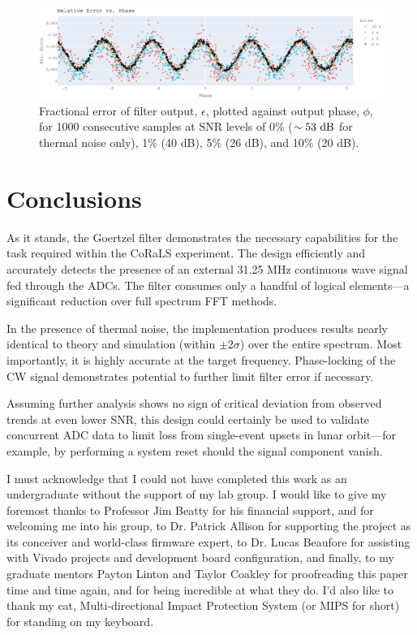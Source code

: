 \documentclass[reprint,amsmath,amssymb,aps,pra]{revtex4-2}
\begin{document}
\begin{figure}[t!]
    \centering
    \includegraphics[width=\linewidth]{figs/error.png}
    \caption{Fractional error of filter output, $\epsilon$, plotted against output phase, $\phi$, for 1000 consecutive samples at SNR levels of 0\% ($\sim53\ \rm{dB}$ for thermal noise only), 1\% (40 dB), 5\% (26 dB), and 10\% (20 dB).}
    \label{fig:SNR}
\end{figure}

\clearpage

\section{Conclusions}

As it stands, the Goertzel filter demonstrates the necessary capabilities for the task required within the CoRaLS experiment. The design efficiently and accurately detects the presence of an external 31.25 MHz continuous wave signal fed through the ADCs. The filter consumes only a handful of logical elements---a significant reduction over full spectrum FFT methods.

In the presence of thermal noise, the implementation produces results nearly identical to theory and simulation (within $\pm2\sigma$) over the entire spectrum. Most importantly, it is highly accurate at the target frequency. Phase-locking of the CW signal demonstrates potential to further limit filter error if necessary.

Assuming further analysis shows no sign of critical deviation from observed trends at even lower SNR, this design could certainly be used to validate concurrent ADC data to limit loss from single-event upsets in lunar orbit---for example, by performing a system reset should the signal component vanish.

\begin{acknowledgments}
    I must acknowledge that I could not have completed this work as an undergraduate without the support of my lab group. I would like to give my foremost thanks to Professor Jim Beatty for his financial support, and for welcoming me into his group, to Dr. Patrick Allison for supporting the project as its conceiver and world-class firmware expert, to Dr. Lucas Beaufore for assisting with Vivado projects and development board configuration, and finally, to my graduate mentors Payton Linton and Taylor Coakley for proofreading this paper time and time again, and for being incredible at what they do. I'd also like to thank my cat, Multi-directional Impact Protection System (or MIPS for short) for standing on my keyboard.
    
    \bigskip

    \bigskip
\end{acknowledgments}

\nocite{*}
\end{document}
